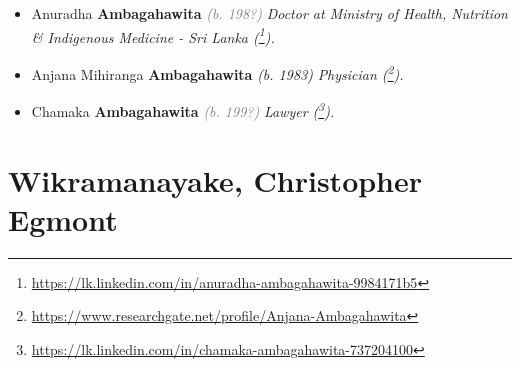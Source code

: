 \documentclass[10pt, openany]{book}
\begin{document}
\begin{itemize}
{\begin{itemize}
{\begin{itemize}
{\begin{itemize}
\item{Anuradha \textbf{Ambagahawita} \textcolor{gray}{\textit{(b. 198?)}} \textcolor{slmaroon}{\textit{Doctor at Ministry of Health, Nutrition \& Indigenous Medicine - Sri Lanka (\footnote{\url{https://lk.linkedin.com/in/anuradha-ambagahawita-9984171b5}}).}}
 }
\item{Anjana Mihiranga \textbf{Ambagahawita} \textcolor{slorange}{\textit{(b. 1983)}} \textcolor{slmaroon}{\textit{Physician (\footnote{\url{https://www.researchgate.net/profile/Anjana-Ambagahawita}}).}}
  }
\item{Chamaka \textbf{Ambagahawita} \textcolor{gray}{\textit{(b. 199?)}} \textcolor{slmaroon}{\textit{Lawyer (\footnote{\url{https://lk.linkedin.com/in/chamaka-ambagahawita-737204100}}).}}
 }
\end{itemize}}
\end{itemize}
 }
\end{itemize}}
\end{itemize}
  
\part{Wikramanayake, Christopher Egmont}
\end{document}
